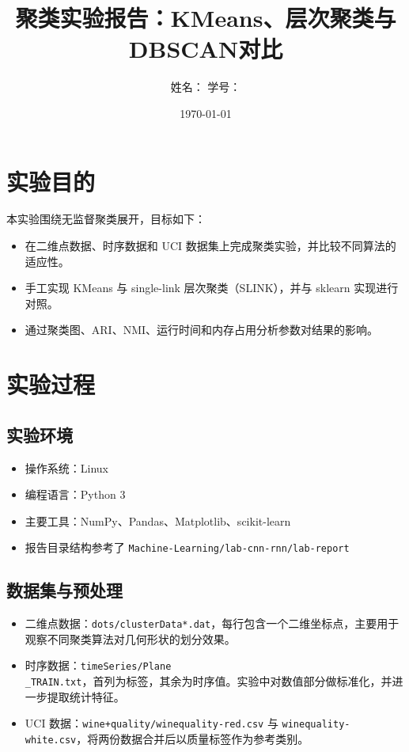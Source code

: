 \documentclass[12pt,a4paper]{ctexart}
\title{聚类实验报告：KMeans、层次聚类与DBSCAN对比}
\author{姓名：\underline{\hspace{3cm}} \quad 学号：\underline{\hspace{3cm}}}
\date{\today}
\begin{document}
\maketitle

\section{实验目的}
本实验围绕无监督聚类展开，目标如下：
\begin{itemize}
  \item 在二维点数据、时序数据和 UCI 数据集上完成聚类实验，并比较不同算法的适应性。
  \item 手工实现 KMeans 与 single-link 层次聚类（SLINK），并与 sklearn 实现进行对照。
  \item 通过聚类图、ARI、NMI、运行时间和内存占用分析参数对结果的影响。
\end{itemize}

\section{实验过程}
\subsection{实验环境}
\begin{itemize}
  \item 操作系统：Linux
  \item 编程语言：Python 3
  \item 主要工具：NumPy、Pandas、Matplotlib、scikit-learn
  \item 报告目录结构参考了 \texttt{Machine-Learning/lab-cnn-rnn/lab-report}
\end{itemize}

\subsection{数据集与预处理}
\begin{itemize}
  \item 二维点数据：\texttt{dots/clusterData*.dat}，每行包含一个二维坐标点，主要用于观察不同聚类算法对几何形状的划分效果。
  \item 时序数据：\texttt{timeSeries/Plane\\_TRAIN.txt}，首列为标签，其余为时序值。实验中对数值部分做标准化，并进一步提取统计特征。
  \item UCI 数据：\texttt{wine+quality/winequality-red.csv} 与 \texttt{winequality-white.csv}，将两份数据合并后以质量标签作为参考类别。
\end{itemize}
\end{document}
